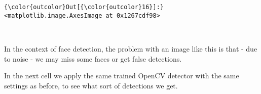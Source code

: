 \documentclass[11pt]{article}
\begin{document}
\begin{Verbatim}[commandchars=\\\{\}]
{\color{outcolor}Out[{\color{outcolor}16}]:} <matplotlib.image.AxesImage at 0x1267cdf98>
\end{Verbatim}
            
    \begin{center}
    \end{center}
    { \hspace*{\fill} \\}
    
    In the context of face detection, the problem with an image like this is
that - due to noise - we may miss some faces or get false detections.

In the next cell we apply the same trained OpenCV detector with the same
settings as before, to see what sort of detections we get.
\end{document}
